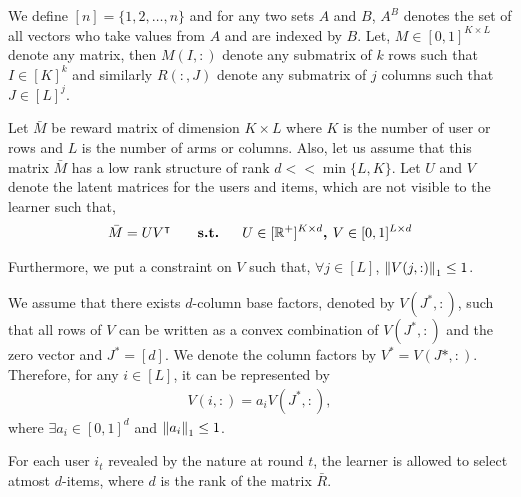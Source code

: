 	
	We define $[n] = \lbrace 1,2,\ldots, n\rbrace$ and for any two sets $A$ and $B$, $A^B$ denotes the set of all vectors who take values from $A$ and are indexed by $B$. Let, $M\in [0,1]^{K\times L}$ denote any matrix, then $M(I,:)$ denote any submatrix of $k$ rows such that $I\in[K]^k$ and similarly $R(:,J)$ denote any submatrix of $j$ columns such that $J\in[L]^{j}$.
	
	Let $\bar{M}$ be reward matrix of  dimension $K\times L$ where $K$ is the number of user or rows and $L$ is the number of arms or columns. Also, let us assume that this matrix  $\bar{M}$ has a low rank structure of rank $d << \min\lbrace L,K\rbrace$. Let $U$ and $V$ denote the latent matrices for the users and items, which are not visible to the learner such that,
\begin{align*}
	\bar{M} = UV^{\intercal} \textbf{ \hspace*{4mm}   s.t.   \hspace*{4mm}} U\in [ \mathbb{R}^+ ]^{K\times d} \textbf{, } V\in  [0,1]^{L\times d} 
\end{align*}	  
	
	Furthermore, we put a constraint on $V$ such that, $\forall j\in [L]$, $ \left\lVert V(j,:)\right\rVert_1 \leq 1$. 
	
	
\begin{assumption}
\label{assm:1}
We assume that there exists $d$-column base factors, denoted by $V(J^*,:)$, such that all rows of $V$ can be written as a convex combination of $V(J^*,:)$ and the zero vector and $J^* = [d]$. We denote the column factors by $V^* = V(J*,:)$. Therefore, for any $i\in [L]$, it can be represented by
\begin{align*}
V(i,:) = a_i V(J^*,:) , 
\end{align*}
where $\exists a_i\in [0,1]^{d}$ and $ \left\lVert a_i\right\rVert_1 \leq 1$.
\end{assumption}


\begin{assumption}
\label{assm:d-items}
For each user $i_t$ revealed by the nature at round $t$, the learner is allowed to select atmost $d$-items, where $d$ is the rank of the matrix $\bar{R}$.
\end{assumption}

